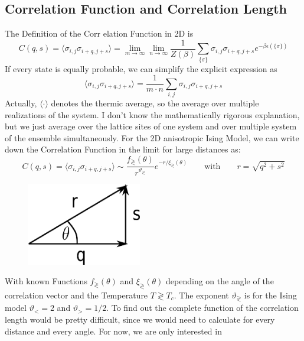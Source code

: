 	\subsection{Correlation Function and Correlation Length}
	The Definition of the Corr
	elation Function in 2D is
	\begin{equation}
		C(q, s) = \langle \sigma_{i,j} \sigma_{i +q ,j +s} \rangle = \lim\limits_{m \rightarrow \infty } \lim\limits_{ n \rightarrow \infty}	\frac{1}{Z(\beta)} \sum_{\lbrace\sigma\rbrace} \sigma_{i,j} \sigma_{i +q ,j +s} e^{- \beta \epsilon(\lbrace \sigma \rbrace)}
	\end{equation}
	If every state is equally probable, we can simplify the explicit expression as
	\begin{equation}
		\langle \sigma_{i,j} \sigma_{i +q ,j +s} \rangle = 	\frac{1}{m \cdot n} \sum_{i, j} \sigma_{i,j} \sigma_{i +q ,j +s}
	\end{equation}
	Actually, $\langle \cdot \rangle$ denotes the thermic average, so the average over multiple realizations of the system. I don't know the mathematically rigorous explanation, but we just average over the lattice sites of one system and over multiple system of the ensemble simultaneously.
	For the 2D anisotropic Ising Model, we can write down the Correlation Function in the limit for large distances as:
	\begin{equation}
		C(q, s) = \langle \sigma_{i,j} \sigma_{i +q ,j +s} \rangle \sim \frac{f_\gtrless(\theta)}{r^{\vartheta_\gtrless}} 	e^{-r /	\xi_\gtrless(\theta)} \qquad \text{with} \qquad r =	\sqrt{q^2 + s^2}
	\end{equation}
	\begin{figure}
		\centering
		\includegraphics[width=5cm]{graphics/corr-func-angle.png}
	\end{figure}
	With known Functions $f_\gtrless(\theta)$ and $\xi_\gtrless(\theta)$ depending on the angle of the correlation vector and the Temperature $ T \gtrless T_c$. The exponent $\vartheta_\gtrless$ is for the Ising model $\vartheta_< =	2$ and $\vartheta_> = 1/2$.
	To find out the complete function of the correlation length would be pretty difficult, since we would need to calculate for every distance and every angle. For now, we are only interested in

